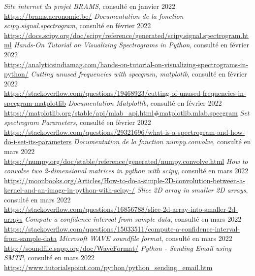\documentclass[11pt]{article}
\begin{document}
\begin{thebibliography}{100}
     \textit{Site internet du projet BRAMS}, consulté en janvier 2022\\\url{https://brams.aeronomie.be/}
     \textit{Documentation de la fonction scipy.signal.spectrogram}, consulté en février 2022\\\url{https://docs.scipy.org/doc/scipy/reference/generated/scipy.signal.spectrogram.html}
     \textit{Hands-On Tutorial on Visualizing Spectrograms in Python}, consulté en février 2022\\\url{https://analyticsindiamag.com/hands-on-tutorial-on-visualizing-spectrograms-in-python/}
     \textit{Cutting unused frequencies with specgram, matplotib}, consulté en février 2022\\\url{https://stackoverflow.com/questions/19468923/cutting-of-unused-frequencies-in-specgram-matplotlib}
     \textit{Documentation Matplotlib}, consulté en février 2022\\\url{https://matplotlib.org/stable/api/mlab_api.html#matplotlib.mlab.specgram}
     \textit{Set spectrogram Parameters}, consulté en février 2022\\\url{https://stackoverflow.com/questions/29321696/what-is-a-spectrogram-and-how-do-i-set-its-parameters}
     \textit{Documentation de la fonction numpy.convolve}, consulté en mars 2022\\\url{https://numpy.org/doc/stable/reference/generated/numpy.convolve.html}
     \textit{How to convolve two 2-dimensional matrices in python with scipy}, consulté en mars 2022\\\url{https://moonbooks.org/Articles/How-to-do-a-simple-2D-convolution-between-a-kernel-and-an-image-in-python-with-scipy-/}
     \textit{Slice 2D array in smaller 2D arrays}, consulté en mars 2022\\\url{https://stackoverflow.com/questions/16856788/slice-2d-array-into-smaller-2d-arrays}
     \textit{Compute a confidence interval from sample data}, consulté en mars 2022\\\url{https://stackoverflow.com/questions/15033511/compute-a-confidence-interval-from-sample-data}
    \textit{Microsoft WAVE soundfile format}, consulté en mars 2022\\\url{http://soundfile.sapp.org/doc/WaveFormat/}
     \textit{Python - Sending Email using SMTP}, consulté en mars 2022\\\url{https://www.tutorialspoint.com/python/python_sending_email.htm}

\end{thebibliography}
\end{document}

